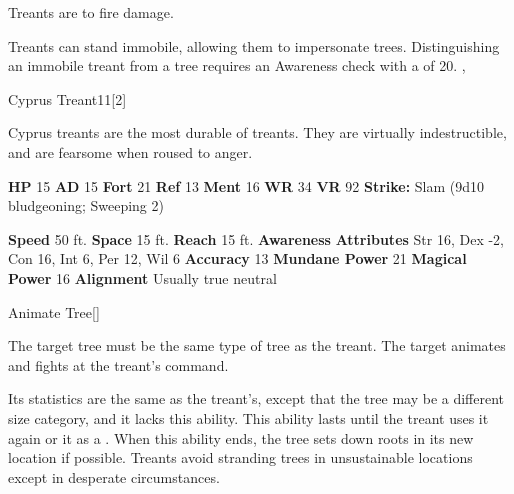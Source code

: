         Treants are  to fire damage.
      
        Treants can stand immobile, allowing them to impersonate trees.
        Distinguishing an immobile treant from a tree requires an Awareness check with a  of 20.
  ,
  \begin{monsubsection}{Cyprus Treant}{11}[2]
    \vspace{-1em}\vspace{-1em}
    \vspace{0em}

    
        Cyprus treants are the most durable of treants.
        They are virtually indestructible, and are fearsome when roused to anger.
      
    

    \begin{spellcontent}
      \begin{spelltargetinginfo}
        \pari \textbf{HP} 15 \monsep
          \textbf{AD} 15 \monsep
          \textbf{Fort} 21 \monsep
          \textbf{Ref} 13 \monsep
          \textbf{Ment} 16
        \pari \textbf{WR} 34 \monsep
        \textbf{VR} 92
        \pari \textbf{Strike:}
            Slam  (9d10 bludgeoning; Sweeping 2)
      \end{spelltargetinginfo}
    \end{spellcontent}
    \begin{monsterfooter}
      \pari \textbf{Speed} 50 ft. \monsep
        \textbf{Space} 15 ft. \monsep
        \textbf{Reach} 15 ft.
      \pari \textbf{Awareness} 
      \pari \textbf{Attributes}
        Str 16, Dex -2,
        Con 16, Int 6,
        Per 12, Wil 6
      \pari \textbf{Accuracy} 13 \monsep
        \textbf{Mundane Power} 21 \monsep
      \textbf{Magical Power} 16
      \pari \textbf{Alignment} Usually true neutral
    \end{monsterfooter}
  \end{monsubsection}
  \begin{freeability}{Animate Tree}[]
      
        The target tree must be the same type of tree as the treant.
        The target animates and fights at the treant's command.

        Its statistics are the same as the treant's, except that the tree may be a different size category, and it lacks this ability.
        This ability lasts until the treant uses it again or  it as a .
        When this ability ends, the tree sets down roots in its new location if possible.
        Treants avoid stranding trees in unsustainable locations except in desperate circumstances.
      
    \end{freeability}
  
